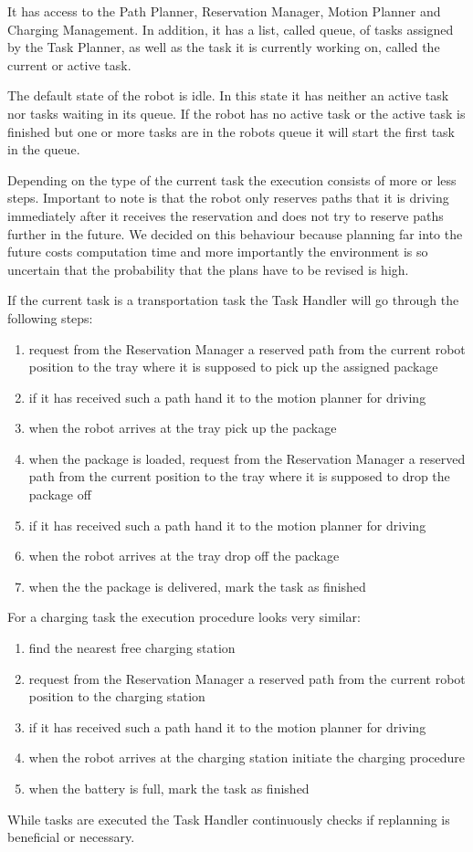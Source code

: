 \documentclass[journal]{IEEEtran}
\begin{document}
It has access to the Path Planner, Reservation Manager, Motion Planner and Charging Management. In addition, it has a list, called queue, of tasks assigned by the Task Planner, as well as the task it is currently working on, called the current or active task.

The default state of the robot is idle. In this state it has neither an active task nor tasks waiting in its queue. If the robot has no active task or the active task is finished but one or more tasks are in the robots queue it will start the first task in the queue.

Depending on the type of the current task the execution consists of more or less steps. Important to note is that the robot only reserves paths that it is driving immediately after it receives the reservation and does not try to reserve paths further in the future. We decided on this behaviour because planning far into the future costs computation time and more importantly the environment is so uncertain that the probability that the plans have to be revised is high.

If the current task is a transportation task the Task Handler will go through the following steps:
\begin{enumerate}
	\item request from the Reservation Manager a reserved path from the current robot position to the tray where it is supposed to pick up the assigned package
	\item if it has received such a path hand it to the motion planner for driving
	\item when the robot arrives at the tray pick up the package
	\item when the package is loaded, request from the Reservation Manager a reserved path from the current position to the tray where it is supposed to drop the package off
	\item if it has received such a path hand it to the motion planner for driving
	\item when the robot arrives at the tray drop off the package
	\item when the the package is delivered, mark the task as finished
\end{enumerate}
For a charging task the execution procedure looks very similar:
\begin{enumerate}
	\item find the nearest free charging station
	\item request from the Reservation Manager a reserved path from the current robot position to the charging station
	\item if it has received such a path hand it to the motion planner for driving
	\item when the robot arrives at the charging station initiate the charging procedure
	\item when the battery is full, mark the task as finished
\end{enumerate}
While tasks are executed the Task Handler continuously checks if replanning is beneficial or necessary.
\end{document}
